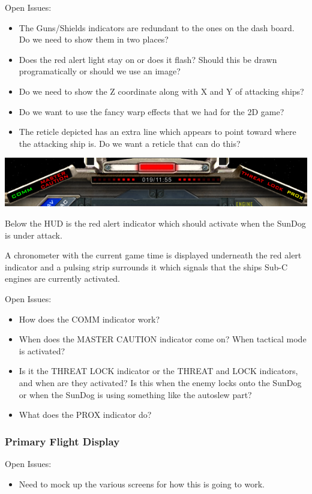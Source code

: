 Open Issues:
\begin{itemize}
\item The Guns\slash Shields indicators are redundant to the ones on
the dash board.  Do we need to show them in two places?
\item Does the red alert light stay on or does it flash?  Should this be
drawn programatically or should we use an image?
\item Do we need to show the Z coordinate along with X and Y of attacking
ships?
\item Do we want to use the fancy warp effects that we had for the 2D
game?
\item The reticle depicted has an extra line which appears to point toward
where the attacking ship is.  Do we want a reticle that can do this?
\end{itemize}

\includegraphics[scale=0.7]{images/lower-hud.png}

Below the HUD is the red alert indicator which should activate when the
SunDog is under attack.

A chronometer with the current game time is displayed underneath the red
alert indicator and a pulsing strip surrounds it which signals that the ships
Sub-C engines are currently activated.

Open Issues:
\begin{itemize}
\item How does the COMM indicator work?
\item When does the MASTER CAUTION indicator come on?  When tactical mode
is activated?
\item Is it the THREAT LOCK indicator or the THREAT and LOCK indicators,
and when are they activated?  Is this when the enemy locks onto the SunDog
or when the SunDog is using something like the autoslew part?
\item What does the PROX indicator do?
\end{itemize}

\subsubsection{Primary Flight Display}

Open Issues:
\begin{itemize}
\item Need to mock up the various screens for how this is going to work.
\end{itemize}

